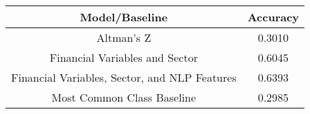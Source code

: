 \footnotesize
\begin{tabular}{cc}
\toprule
Model/Baseline & Accuracy \\
\midrule
Altman's Z & 0.3010 \\
Financial Variables and Sector & 0.6045 \\
Financial Variables, Sector, and NLP Features & 0.6393 \\
Most Common Class Baseline & 0.2985 \\
\bottomrule
\end{tabular}

\normalsize